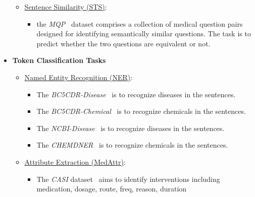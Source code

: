 \documentclass{article} %
\begin{document}
\begin{itemize}[leftmargin=0.3cm]
\begin{itemize}[label=$\circ$]
\item \uline{Sentence Similarity (STS)}:
\begin{itemize}
    \item the \textit{MQP}~\citep{mqp} dataset comprises a collection of medical question pairs designed for identifying semantically similar questions. The task is to predict whether the two questions are equivalent or not.
\end{itemize}
\end{itemize}

\item \textbf{Token Classification Tasks}
\begin{itemize}[label=$\circ$]
\item \uline{Named Entity Recognition (NER)}:
\begin{itemize}
    \item The \textit{BC5CDR-Disease}~\citep{li2016biocreative} is to recognize diseases in the sentences.
    \item The \textit{BC5CDR-Chemical}~\citep{li2016biocreative} is to recognize chemicals in the sentences.
    \item The \textit{NCBI-Disease}~\citep{ncbi-disease} is to recognize diseases in the sentences.
    \item The \textit{CHEMDNER}~\citep{chemdner} is to recognize chemicals in the sentences.
\end{itemize}

\item \uline{Attribute Extraction (MedAttr)}:
\begin{itemize}
    \item The \textit{CASI} dataset~\citep{agrawal2022large,claim} aims to identify interventions including medication, dosage, route, freq, reason, duration
\end{itemize}
\end{itemize}
\end{itemize}
\end{document}
